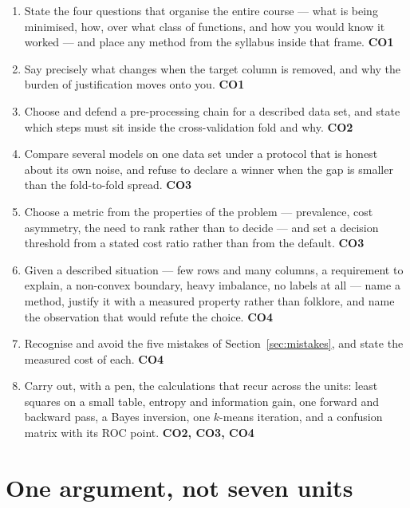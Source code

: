 \documentclass[11pt]{article}
\begin{document}
\begin{enumerate}[leftmargin=*]
  \item State the four questions that organise the entire course --- what is
    being minimised, how, over what class of functions, and how you would
    know it worked --- and place any method from the syllabus inside that
    frame. \hfill \textbf{CO1}
  \item Say precisely what changes when the target column is removed, and why
    the burden of justification moves onto you. \hfill \textbf{CO1}
  \item Choose and defend a pre-processing chain for a described data set,
    and state which steps must sit inside the cross-validation fold and why.
    \hfill \textbf{CO2}
  \item Compare several models on one data set under a protocol that is
    honest about its own noise, and refuse to declare a winner when the gap
    is smaller than the fold-to-fold spread. \hfill \textbf{CO3}
  \item Choose a metric from the properties of the problem --- prevalence,
    cost asymmetry, the need to rank rather than to decide --- and set a
    decision threshold from a stated cost ratio rather than from the default.
    \hfill \textbf{CO3}
  \item Given a described situation --- few rows and many columns, a
    requirement to explain, a non-convex boundary, heavy imbalance, no labels
    at all --- name a method, justify it with a measured property rather than
    folklore, and name the observation that would refute the choice.
    \hfill \textbf{CO4}
  \item Recognise and avoid the five mistakes of Section~\ref{sec:mistakes},
    and state the measured cost of each. \hfill \textbf{CO4}
  \item Carry out, with a pen, the calculations that recur across the units:
    least squares on a small table, entropy and information gain, one forward
    and backward pass, a Bayes inversion, one $k$-means iteration, and a
    confusion matrix with its ROC point. \hfill \textbf{CO2, CO3, CO4}
\end{enumerate}

\section{One argument, not seven units}
\label{sec:spine}
\end{document}
